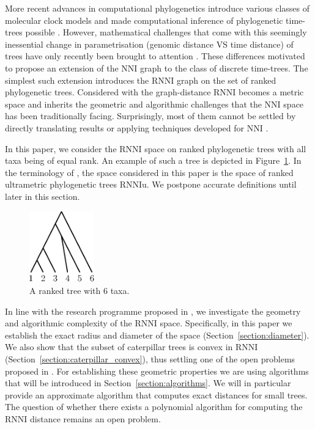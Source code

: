 \documentclass{amsart}
\newcommand{\nni}{\mathrm{NNI}}
\newcommand{\rnni}{\mathrm{RNNI}}
\newcommand{\rnniu}{\mathrm{RNNIu}}
\begin{document}
More recent advances in computational phylogenetics introduce various classes of molecular clock models \autocite{Yoder2000-ks,Drummond2006-nl,Drummond2010-yf} and made computational inference of phylogenetic time-trees possible \autocite{Ronquist2003-eq, Bouckaert2018-yr, Hadfield2018-xp}.
However, mathematical challenges that come with this seemingly inessential change in parametrisation (genomic distance VS time distance) of trees have only recently been brought to attention \autocite{Gavryushkin2016-uu}.
These differences motivated \textcite{Gavryushkin2018-ol} to propose an extension of the $\nni$ graph to the class of discrete time-trees.
The simplest such extension introduces the $\rnni$ graph on the set of ranked phylogenetic trees.
Considered with the graph-distance $\rnni$ becomes a metric space and inherits the geometric and algorithmic challenges that the $\nni$ space has been traditionally facing.
Surprisingly, most of them cannot be settled by directly translating results or applying techniques developed for $\nni$ \autocite{Gavryushkin2018-ol}.

In this paper, we consider the $\rnni$ space on ranked phylogenetic trees with all taxa being of equal rank.
An example of such a tree is depicted in Figure~\ref{fig:ranked_tree}.
In the terminology of \autocite{Gavryushkin2018-ol}, the space considered in this paper is the space of ranked ultrametric phylogenetic trees $\rnniu$.
We postpone accurate definitions until later in this section.

\begin{figure}[H]
\centering
\includegraphics[width=0.25\textwidth]{ranked_tree}
\vspace{12pt}
\caption{A ranked tree with $6$ taxa.}
\label{fig:ranked_tree}
\end{figure}

In line with the research programme proposed in \autocite{Gavryushkin2018-ol}, we investigate the geometry and algorithmic complexity of the $\rnni$ space.
Specifically, in this paper we establish the exact radius and diameter of the space (Section~\ref{section:diameter}).
We also show that the subset of caterpillar trees is convex in $\rnni$ (Section~\ref{section:caterpillar_convex}), thus settling one of the open problems proposed in \autocite{Gavryushkin2018-ol}.
For establishing these geometric properties we are using algorithms that will be introduced in Section~\ref{section:algorithms}.
We will in particular provide an approximate algorithm that computes exact distances for small trees.
The question of whether there exists a polynomial algorithm for computing the $\rnni$ distance remains an open problem.
\end{document}
